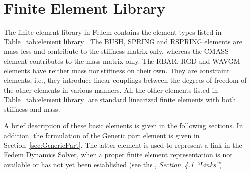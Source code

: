 %
%

%
%

\chapter{Finite Element Library}
\label{chap:ElLibrary}

The finite element library in Fedem contains the element types listed in
Table~\ref{tab:element library}.
The BUSH, SPRING and RSPRING elements are mass less and contribute to the
stiffness matrix only,
whereas the CMASS element contributes to the mass matrix only.
The RBAR, RGD and WAVGM elements have neither mass nor stiffness on their own.
They are constraint elements, i.e., they introduce linear couplings between
the degrees of freedom of the other elements in various manners.
All the other elements listed in Table~\ref{tab:element library} are standard
linearized finite elements with both stiffness and mass.

A brief description of these basic elements is given in the following sections.
In addition, the formulation of the Generic part element is given in
Section~\ref{sec:GenericPart}.
The latter element is used to represent a link in the Fedem Dynamics Solver,
when a proper finite element representation is not available or has not yet
been established (see the \FedemUG, {\em Section~4.1 ``Links''}).

